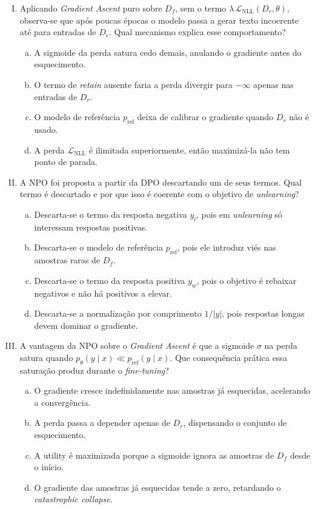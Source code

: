 \documentclass{dlproblemset}
\begin{document}
\begin{enumerate}[I)]
    \item Aplicando \textit{Gradient Ascent} puro sobre $D_f$, sem o termo $\lambda\,\mathcal{L}_{\text{NLL}}(D_r,\theta)$, observa-se que após poucas épocas o modelo passa a gerar texto incoerente até para entradas de $D_r$. Qual mecanismo explica esse comportamento?
    \begin{enumerate}[(a)]
        \item A sigmoide da perda satura cedo demais, anulando o gradiente antes do esquecimento.
        \item O termo de \textit{retain} ausente faria a perda divergir para $-\infty$ apenas nas entradas de $D_r$.
        \item O modelo de referência $p_{\text{ref}}$ deixa de calibrar o gradiente quando $D_r$ não é usado.
        \item A perda $\mathcal{L}_{\text{NLL}}$ é ilimitada superiormente, então maximizá-la não tem ponto de parada.
    \end{enumerate}

    \item A NPO foi proposta a partir da DPO descartando um de seus termos. Qual termo é descartado e por que isso é coerente com o objetivo de \textit{unlearning}?
    \begin{enumerate}[(a)]
        \item Descarta-se o termo da resposta negativa $y_l$, pois em \textit{unlearning} só interessam respostas positivas.
        \item Descarta-se o modelo de referência $p_{\text{ref}}$, pois ele introduz viés nas amostras raras de $D_f$.
        \item Descarta-se o termo da resposta positiva $y_w$, pois o objetivo é rebaixar negativos e não há positivos a elevar.
        \item Descarta-se a normalização por comprimento $1/|y|$, pois respostas longas devem dominar o gradiente.
    \end{enumerate}

    \item A vantagem da NPO sobre o \textit{Gradient Ascent} é que a sigmoide $\sigma$ na perda satura quando $p_\theta(y\mid x) \ll p_{\text{ref}}(y\mid x)$. Que consequência prática essa saturação produz durante o \textit{fine-tuning}?
    \begin{enumerate}[(a)]
        \item O gradiente cresce indefinidamente nas amostras já esquecidas, acelerando a convergência.
        \item A perda passa a depender apenas de $D_r$, dispensando o conjunto de esquecimento.
        \item A utility é maximizada porque a sigmoide ignora as amostras de $D_f$ desde o início.
        \item O gradiente das amostras já esquecidas tende a zero, retardando o \textit{catastrophic collapse}.
    \end{enumerate}


\end{enumerate}
\end{document}
